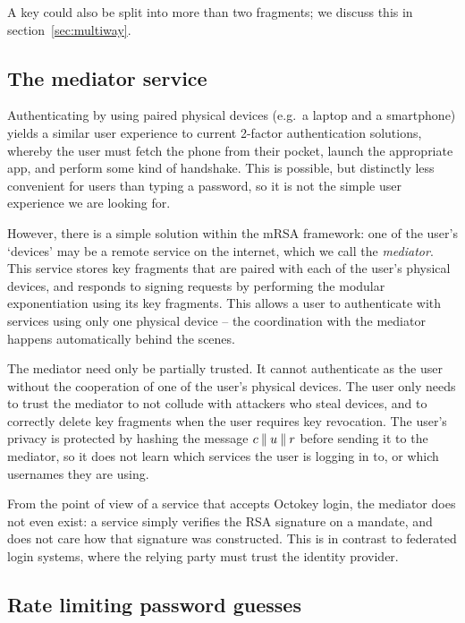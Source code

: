 A key could also be split into more than two fragments; we discuss this in section~\ref{sec:multiway}.

\subsection{The mediator service}\label{sec:mediator}

Authenticating by using paired physical devices (e.g.\ a laptop and a smartphone) yields a similar
user experience to current 2-factor authentication solutions, whereby the user must fetch the phone
from their pocket, launch the appropriate app, and perform some kind of handshake. This is
possible, but distinctly less convenient for users than typing a password, so it is not the simple
user experience we are looking for.

However, there is a simple solution within the mRSA framework: one of the user's `devices' may be a
remote service on the internet, which we call the \emph{mediator}. This service stores key fragments
that are paired with each of the user's physical devices, and responds to signing requests by
performing the modular exponentiation using its key fragments. This allows a user to authenticate
with services using only one physical device -- the coordination with the mediator happens
automatically behind the scenes.

The mediator need only be partially trusted. It cannot authenticate as the user without the
cooperation of one of the user's physical devices. The user only needs to trust the mediator to not
collude with attackers who steal devices, and to correctly delete key fragments when the user
requires key revocation. The user's privacy is protected by hashing the message $c \mathbin{\|} u \mathbin{\|} r$
before sending it to the mediator, so it does not learn which services the user is logging in to,
or which usernames they are using.

From the point of view of a service that accepts Octokey login, the mediator does not even exist: a
service simply verifies the RSA signature on a mandate, and does not care how that signature was
constructed. This is in contrast to federated login systems, where the relying party must trust the
identity provider.

\subsection{Rate limiting password guesses}\label{sec:ratelimit}

